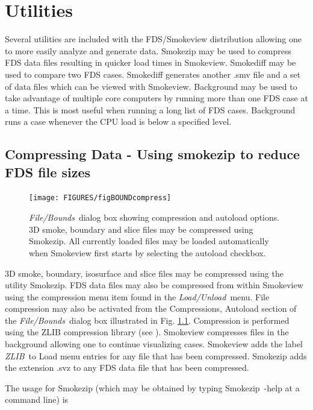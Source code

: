 \documentclass[11pt,twoside]{book}
\begin{document}
\chapter{Utilities}
Several utilities are included with the FDS/Smokeview distribution allowing one
to more easily analyze and generate data.  Smokezip may be used to compress
FDS data files resulting in quicker load times in Smokeview.  Smokediff may be used
to compare two FDS cases.  Smokediff generates another .smv file and a set of data files
which can be viewed with Smokeview.  Background may be used to take advantage of multiple
core computers by running more than one FDS case at a time.  This is most useful when running
a long list of FDS cases. Background runs a case whenever the CPU load is below a specified level.


\section{Compressing Data - Using smokezip to reduce FDS file sizes}
\label{ch:smokezip}

\begin{figure}[\figoptions]
\centerline{\texttt{[image: FIGURES/figBOUNDcompress]} }
\caption[{\em Compress Files}\ and {\em Autoload}\ dialog box.] {{\em File/Bounds}\ dialog
box showing compression and autoload options.  3D smoke,  boundary and slice
files may be compressed using Smokezip.  All currently loaded
files may be loaded automatically when Smokeview first starts by
selecting the autoload checkbox.} \label{figBOUNDScompress}
\end{figure}

3D smoke, boundary, isosurface and slice files may be compressed
using the utility Smokezip.  FDS data files may also be compressed
from within Smokeview using the compression menu item found in the
{\em Load/Unload}\ menu.  File compression may also be activated
from the Compressions, Autoload section of the {\em File/Bounds}\
dialog box illustrated in Fig. \ref{figBOUNDScompress}.
Compression is performed using the ZLIB compression library (see
\hhref{http://www.zlib.org}). Smokeview compresses files in the
background allowing one to continue visualizing cases.  Smokeview
adds the label {\em ZLIB}\ to Load menu entries for any file that
has been compressed. Smokezip adds the extension .svz to any FDS
data file that has been compressed.

The usage for Smokezip (which may be obtained by typing Smokezip~-help at a command line) is
\end{document}
